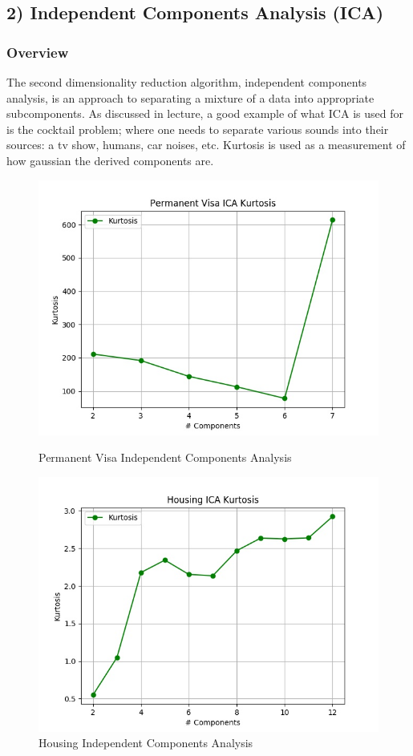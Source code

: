 \documentclass[h]{article}
\begin{document}
\subsection*{2) Independent Components Analysis (ICA)}  
\subsubsection*{Overview}
The second dimensionality reduction algorithm, independent components analysis, 
is an approach to separating a mixture of a data into appropriate subcomponents. 
 As discussed in lecture, a good example of what ICA is used for is the cocktail problem; where one needs to 
 separate various sounds into their sources: a tv show, humans, car noises, etc.  
  Kurtosis is used as a measurement of how gaussian the derived components 
  are.
  

 \begin{figure}[H]
      \includegraphics[width=1\textwidth,keepaspectratio]{permanent_visa_ica_kurtosis.jpg} 
      \caption*{Permanent Visa Independent Components Analysis } 
   \endminipage\hfill
      \includegraphics[width=1\textwidth,keepaspectratio]{housing_ica_kurtosis.jpg} 
      \caption*{Housing Independent Components Analysis } 
   \endminipage\hfill
\end{figure}
\end{document}
